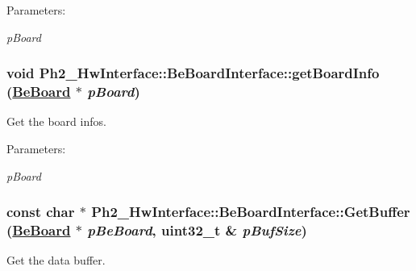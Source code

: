 \begin{Desc}
\item[Parameters:]
\begin{description}
\item[{\em p\-Board}]\end{description}
\end{Desc}
\hypertarget{class_ph2___hw_interface_1_1_be_board_interface_e423a6ec7526a0abd9ce3c9e0e3b1847}{
\subsubsection[getBoardInfo]{\setlength{\rightskip}{0pt plus 5cm}void Ph2\_\-Hw\-Interface::Be\-Board\-Interface::get\-Board\-Info (\hyperlink{class_ph2___hw_description_1_1_be_board}{Be\-Board} $\ast$ {\em p\-Board})}}
\label{class_ph2___hw_interface_1_1_be_board_interface_e423a6ec7526a0abd9ce3c9e0e3b1847}


Get the board infos. 

\begin{Desc}
\item[Parameters:]
\begin{description}
\item[{\em p\-Board}]\end{description}
\end{Desc}
\hypertarget{class_ph2___hw_interface_1_1_be_board_interface_09475ae1eaaf7a7ca50c5b426c93152f}{
\subsubsection[GetBuffer]{\setlength{\rightskip}{0pt plus 5cm}const char $\ast$ Ph2\_\-Hw\-Interface::Be\-Board\-Interface::Get\-Buffer (\hyperlink{class_ph2___hw_description_1_1_be_board}{Be\-Board} $\ast$ {\em p\-Be\-Board}, uint32\_\-t \& {\em p\-Buf\-Size})}}
\label{class_ph2___hw_interface_1_1_be_board_interface_09475ae1eaaf7a7ca50c5b426c93152f}


Get the data buffer. 

